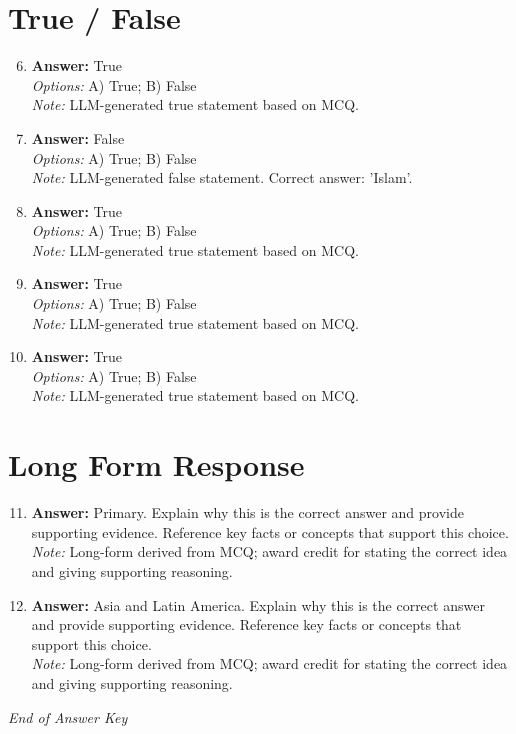 \documentclass[12pt]{article}
\begin{document}
\section*{True / False}
\begin{enumerate}[label=\arabic*.]
\setcounter{enumi}{5}
\item \textbf{Answer:} True
\\ \textit{Options:} A) True; B) False
\\ \textit{Note:} LLM-generated true statement based on MCQ.
\item \textbf{Answer:} False
\\ \textit{Options:} A) True; B) False
\\ \textit{Note:} LLM-generated false statement. Correct answer: 'Islam'.
\item \textbf{Answer:} True
\\ \textit{Options:} A) True; B) False
\\ \textit{Note:} LLM-generated true statement based on MCQ.
\item \textbf{Answer:} True
\\ \textit{Options:} A) True; B) False
\\ \textit{Note:} LLM-generated true statement based on MCQ.
\item \textbf{Answer:} True
\\ \textit{Options:} A) True; B) False
\\ \textit{Note:} LLM-generated true statement based on MCQ.
\end{enumerate}

\section*{Long Form Response}
\begin{enumerate}[label=\arabic*.]
\setcounter{enumi}{10}
\item \textbf{Answer:} Primary. Explain why this is the correct answer and provide supporting evidence. Reference key facts or concepts that support this choice.
\\ \textit{Note:} Long-form derived from MCQ; award credit for stating the correct idea and giving supporting reasoning.
\item \textbf{Answer:} Asia and Latin America. Explain why this is the correct answer and provide supporting evidence. Reference key facts or concepts that support this choice.
\\ \textit{Note:} Long-form derived from MCQ; award credit for stating the correct idea and giving supporting reasoning.
\end{enumerate}

\vfill
\noindent\textit{End of Answer Key}
\end{document}
